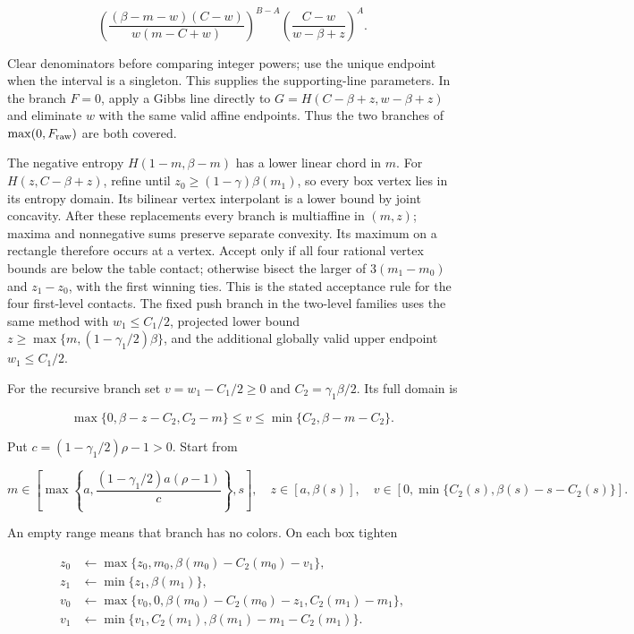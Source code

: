 \[
\left(\frac{(\beta-m-w)(C-w)}{w(m-C+w)}\right)^{B-A}
\left(\frac{C-w}{w-\beta+z}\right)^A.
\tag{116}
\]

Clear denominators before comparing integer powers; use the unique endpoint when the interval is a singleton. This supplies the supporting-line parameters. In the branch \(F=0\), apply a Gibbs line directly to \(G=H(C-\beta+z,w-\beta+z)\) and eliminate \(w\) with the same valid affine endpoints. Thus the two branches of \(\max(0,F_{\rm raw})\) are both covered.

The negative entropy \(H(1-m,\beta-m)\) has a lower linear chord in \(m\). For \(H(z,C-\beta+z)\), refine until \(z_0\ge(1-\gamma)\beta(m_1)\), so every box vertex lies in its entropy domain. Its bilinear vertex interpolant is a lower bound by joint concavity. After these replacements every branch is multiaffine in \((m,z)\); maxima and nonnegative sums preserve separate convexity. Its maximum on a rectangle therefore occurs at a vertex. Accept only if all four rational vertex bounds are below the table contact; otherwise bisect the larger of \(3(m_1-m_0)\) and \(z_1-z_0\), with the first winning ties. This is the stated acceptance rule for the four first-level contacts. The fixed push branch in the two-level families uses the same method with \(w_1\le C_1/2\), projected lower bound \(z\ge\max\{m,(1-\gamma_1/2)\beta\}\), and the additional globally valid upper endpoint \(w_1\le C_1/2\).

For the recursive branch set \(v=w_1-C_1/2\ge0\) and \(C_2=\gamma_1\beta/2\). Its full domain is

\[
\max\{0,\beta-z-C_2,C_2-m\}\le v
 \le\min\{C_2,\beta-m-C_2\}.
\tag{117}
\]

Put \(c=(1-\gamma_1/2)\rho-1>0\). Start from

\[
m\in\left[\max\left\{a,
\frac{(1-\gamma_1/2)a(\rho-1)}c\right\},s\right],\quad
z\in[a,\beta(s)],\quad
v\in[0,\min\{C_2(s),\beta(s)-s-C_2(s)\}].
\]

An empty range means that branch has no colors. On each box tighten

\[
\begin{aligned}
z_0&\leftarrow\max\{z_0,m_0,\beta(m_0)-C_2(m_0)-v_1\},\\
z_1&\leftarrow\min\{z_1,\beta(m_1)\},\\
v_0&\leftarrow\max\{v_0,0,\beta(m_0)-C_2(m_0)-z_1,C_2(m_1)-m_1\},\\
v_1&\leftarrow\min\{v_1,C_2(m_1),\beta(m_1)-m_1-C_2(m_1)\}.
\end{aligned}
\tag{118}
\]

